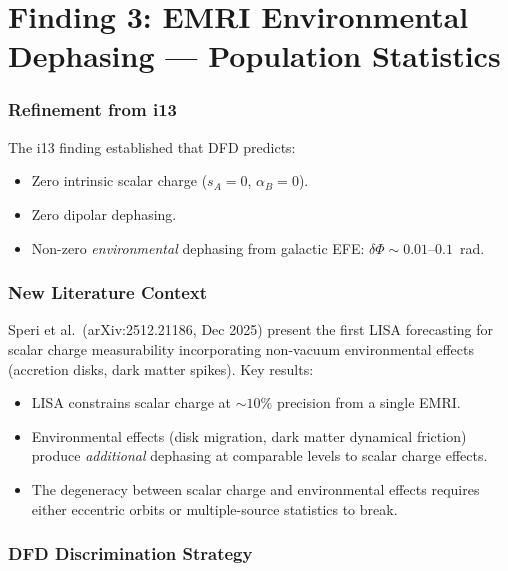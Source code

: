 \documentclass[11pt]{article}
\begin{document}
\part{Finding 3: EMRI Environmental Dephasing --- Population Statistics}
\label{part:EMRI-pop}

\section{Refinement from i13}

The i13 finding established that DFD predicts:
\begin{itemize}[nosep]
\item Zero intrinsic scalar charge ($s_A = 0$, $\alpha_B = 0$).
\item Zero dipolar dephasing.
\item Non-zero \emph{environmental} dephasing from galactic EFE:
  $\delta\Phi \sim 0.01$--$0.1$~rad.
\end{itemize}

\section{New Literature Context}

Speri et al.\ (arXiv:2512.21186, Dec 2025) present the first LISA
forecasting for scalar charge measurability incorporating non-vacuum
environmental effects (accretion disks, dark matter spikes). Key
results:
\begin{itemize}[nosep]
\item LISA constrains scalar charge at $\sim 10\%$ precision from a
  single EMRI.
\item Environmental effects (disk migration, dark matter dynamical
  friction) produce \emph{additional} dephasing at comparable levels
  to scalar charge effects.
\item The degeneracy between scalar charge and environmental effects
  requires either eccentric orbits or multiple-source statistics to
  break.
\end{itemize}

\section{DFD Discrimination Strategy}
\end{document}
